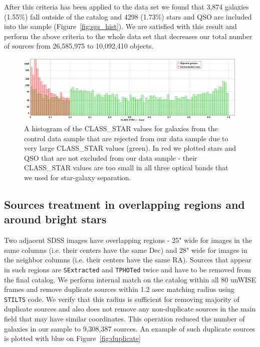 After this criteria has been applied to the data set we found that 3,874 galaxies (1.55\%) fall outside of the catalog and 4298 (1.73\%) stars and QSO are included into the sample (Figure~\ref{fig:sgs_hist}). We are satisfied with this result and perform the above criteria to the whole data set that decreases our total number of sources from 26,585,975 to 10,092,410 objects.

\begin{figure}[!ht]
\includegraphics[width=5.7in]{Figures/histogram_class_star_contamination.png}
\caption{A histogram of the CLASS\_STAR values for galaxies from the control data sample that are rejected from our data sample due to very large CLASS\_STAR values (green). In red we plotted stars and QSO that are not excluded from our data sample - their CLASS\_STAR values are too small in all three optical bands that we used for star-galaxy separation.}
\label{fig:sgs_cont}
\end{figure}


\subsection{Sources treatment in overlapping regions and around bright stars}

Two adjacent SDSS images have overlapping regions - 25" wide for images in the same columns (i.e. their centers have the same Dec) and 28" wide for images in the neighbor columns (i.e. their centers have the same RA). Sources that appear in such regions are {\tt SExtracted} and {\tt TPHOTed} twice and have to be removed from the final catalog. We perform internal match on the catalog within all 80 unWISE frames and remove duplicate sources within 1.2 asec matching radius using {\tt STILTS} code. We verify that this radius is sufficient for removing majority of duplicate sources and also does not remove any non-duplicate sources in the main field that may have similar coordinates. This operation reduced the number of galaxies in our sample to 9,308,387 sources. An example of such duplicate sources is plotted with blue on Figure~\ref{fig:duplicate}

